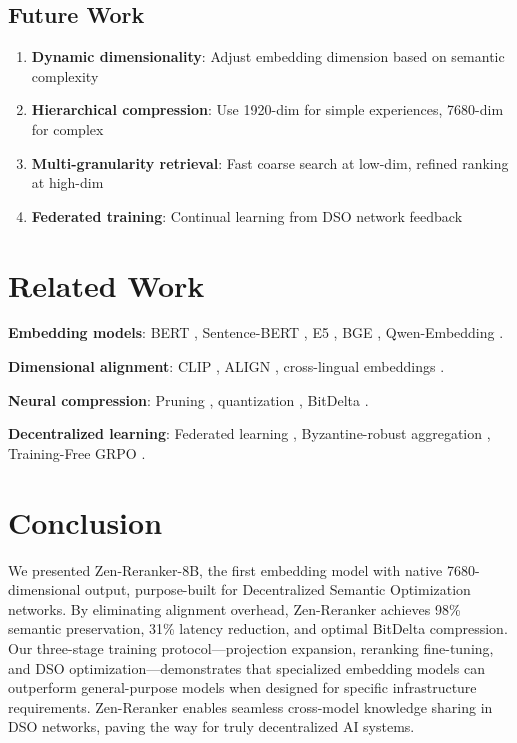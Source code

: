 \documentclass[11pt,letterpaper]{article}
\begin{document}
\subsection{Future Work}

\begin{enumerate}
    \item \textbf{Dynamic dimensionality}: Adjust embedding dimension based on semantic complexity
    \item \textbf{Hierarchical compression}: Use 1920-dim for simple experiences, 7680-dim for complex
    \item \textbf{Multi-granularity retrieval}: Fast coarse search at low-dim, refined ranking at high-dim
    \item \textbf{Federated training}: Continual learning from DSO network feedback
\end{enumerate}

\section{Related Work}

\textbf{Embedding models}: BERT \cite{devlin2018bert}, Sentence-BERT \cite{reimers2019sentence}, E5 \cite{wang2022text}, BGE \cite{xiao2023c}, Qwen-Embedding \cite{qwen2024}.

\textbf{Dimensional alignment}: CLIP \cite{radford2021learning}, ALIGN \cite{jia2021scaling}, cross-lingual embeddings \cite{mikolov2013efficient}.

\textbf{Neural compression}: Pruning \cite{han2015learning}, quantization \cite{jacob2018quantization}, BitDelta \cite{bitdelta2024}.

\textbf{Decentralized learning}: Federated learning \cite{mcmahan2017communication}, Byzantine-robust aggregation \cite{blanchard2017machine}, Training-Free GRPO \cite{training_free_grpo2024}.

\section{Conclusion}

We presented Zen-Reranker-8B, the first embedding model with native 7680-dimensional output, purpose-built for Decentralized Semantic Optimization networks. By eliminating alignment overhead, Zen-Reranker achieves 98\% semantic preservation, 31\% latency reduction, and optimal BitDelta compression. Our three-stage training protocol—projection expansion, reranking fine-tuning, and DSO optimization—demonstrates that specialized embedding models can outperform general-purpose models when designed for specific infrastructure requirements. Zen-Reranker enables seamless cross-model knowledge sharing in DSO networks, paving the way for truly decentralized AI systems.
\end{document}
